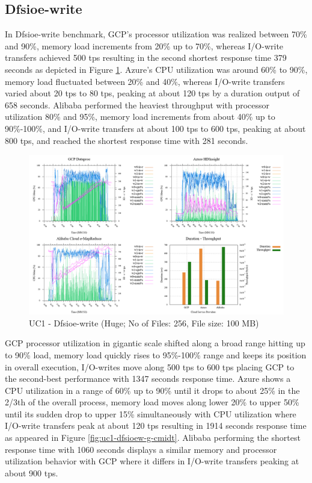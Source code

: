 \documentclass[review]{elsarticle}
\begin{document}
\subsection{Dfsioe-write}
In Dfsioe-write benchmark, GCP's processor utilization was realized between 70\% and 90\%, memory load increments from 20\% up to 70\%, whereas I/O-write transfers achieved 500 tps resulting in the second shortest response time 379 seconds as depicted in Figure \ref{fig:uc1-dfsioew-h-cmidt}. Azure's CPU utilization was around 60\% to 90\%, memory load fluctuated between 20\% and 40\%, whereas I/O-write transfers varied about 20 tps to 80 tps, peaking at about 120 tps by a duration output of 658 seconds. Alibaba performed the heaviest throughput with processor utilization 80\% and 95\%, memory load increments from about 40\% up to 90\%-100\%, and I/O-write transfers at about 100 tps to 600 tps, peaking at about 800 tps, and reached the shortest response time with 281 seconds.

\begin{figure}[p]
	\caption{UC1 - Dfsioe-write (Huge; No of Files: 256, File size: 100 MB)}
	\label{fig:uc1-dfsioew-h-cmidt}
	\includegraphics[width=\textwidth]{uc1-dfsioew-h-cmidt}
	\centering
\end{figure}

GCP processor utilization in gigantic scale shifted along a broad range hitting up to 90\% load, memory load quickly rises to 95\%-100\% range and keeps its position in overall execution, I/O-writes move along 500 tps to 600 tps placing GCP to the second-best performance with 1347 seconds response time. Azure shows a CPU utilization in a range of 60\% up to 90\% until it drops to about 25\% in the 2/3th of the overall process, memory load moves along lower 20\% to upper 50\% until its sudden drop to upper 15\% simultaneously with CPU utilization where I/O-write transfers peak at about 120 tps resulting in 1914 seconds response time as appeared in Figure \ref{fig:uc1-dfsioew-g-cmidt}. Alibaba performing the shortest response time with 1060 seconds displays a similar memory and processor utilization behavior with GCP where it differs in I/O-write transfers peaking at about 900 tps.
\end{document}

